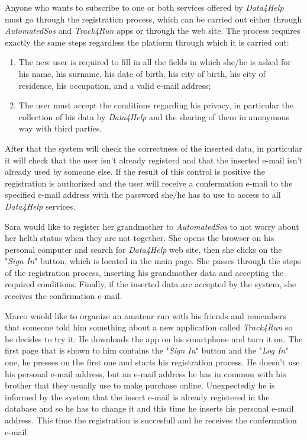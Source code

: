 Anyone who wants to subscribe to one or both services offered by \textit{Data4Help} must go through the registration process, which can be carried out either through \textit{AutomatedSos} and \textit{Track4Run} apps or through the web site.
The process requires exactly the same steps regardless the platform through which it is carried out:
\begin{enumerate}
  \item The new user is required to fill in all the fields in which she/he is asked for his name, his surname, his date of birth, his city of birth, his city of residence, his occupation, and a valid e-mail address;
  \item The user must accept the conditions regarding his privacy, in particular the collection of his data by \textit{Data4Help} and the sharing of them in anonymous way with third parties.
\end{enumerate}
After that the system will check the correctness of the inserted data, in particular it will check that the user isn't already registerd and that the inserted e-mail isn't already used by someone else. If the result of this control is positive the registration is authorized and the user will receive a confermation e-mail to the specified e-mail address with the password she/he has to use to access to all \textit{Data4Help} services.

 \label{aSOSsignin}
Sara would like to register her grandmother to \textit{AutomatedSos} to not worry about her helth status when they are not together. She opens the browser on his personal computer and search for \textit{Data4Help} web site, then she clicks on the "\textit{Sign In}" button, which is located in the main page. She passes through the steps of the registration process, inserting his grandmother data and accepting the required conditions. Finally, if the inserted data are accepted by the system, she receives the confirmation e-mail.

Marco wuold like to organize an amateur run with his friends and remembers that someone told him something about a new application called \textit{Track4Run} so he decides to try it. He downloads the app on his smartphone and turn it on. The first page that is shown to him contains the "\textit{Sign In}" button and the "\textit{Log In}" one, he presses on the first one and starts his registration process. He doesn't use his personal e-mail address, but an e-mail address he has in common with his brother that they usually use to make purchase online. Unexpectedly he is informed by the system that the insert e-mail is already registered in the database and so he has to change it and this time he inserts his personal e-mail address. This time the registration is succesfull and he receives the confermation e-mail.

